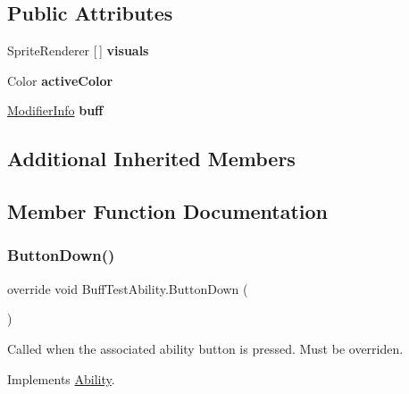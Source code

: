 \subsection*{Public Attributes}
\begin{DoxyCompactItemize}
\item 
\hypertarget{class_buff_test_ability_a6e5ae7a8636205d06eedcf51fee89d55}{}\label{class_buff_test_ability_a6e5ae7a8636205d06eedcf51fee89d55} 
Sprite\+Renderer \mbox{[}$\,$\mbox{]} {\bfseries visuals}
\item 
\hypertarget{class_buff_test_ability_a8ba92ecd4b93dc6f12b5b4c6caa3ce24}{}\label{class_buff_test_ability_a8ba92ecd4b93dc6f12b5b4c6caa3ce24} 
Color {\bfseries active\+Color}
\item 
\hypertarget{class_buff_test_ability_a2267dd4c3ef91b736de18e7d7e436aa3}{}\label{class_buff_test_ability_a2267dd4c3ef91b736de18e7d7e436aa3} 
\hyperlink{struct_modifier_info}{Modifier\+Info} {\bfseries buff}
\end{DoxyCompactItemize}
\subsection*{Additional Inherited Members}


\subsection{Member Function Documentation}
\hypertarget{class_buff_test_ability_a45e7ab9bd436078b50ed112b75e97508}{}\label{class_buff_test_ability_a45e7ab9bd436078b50ed112b75e97508} 
\subsubsection{\texorpdfstring{Button\+Down()}{ButtonDown()}}
{\footnotesize\ttfamily override void Buff\+Test\+Ability.\+Button\+Down (\begin{DoxyParamCaption}{ }\end{DoxyParamCaption})\hspace{0.3cm}{\ttfamily [virtual]}}



Called when the associated ability button is pressed. Must be overriden. 



Implements \hyperlink{class_ability_a7722265862f8b29828315725415ce266}{Ability}.

